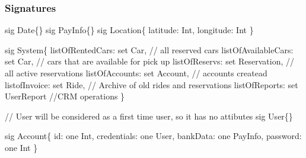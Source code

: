 \documentclass[a4paper]{article}
\begin{document}
\subsubsection{Signatures}

sig Date\{\} \newline
\newline
sig PayInfo\{\} \newline
\newline
sig Location\{ \newline
\hspace*{5 mm}	latitude: Int, \newline
\hspace*{5 mm}	longitude: Int \newline
\} \newline

sig System\{ \newline
\hspace*{5 mm}	listOfRentedCars: set Car, // all reserved cars   \newline
\hspace*{5 mm}	listOfAvailableCars: set Car, // cars that are available for pick up  \newline
\hspace*{5 mm}	listOfReservs: set Reservation, // all active reservations  \newline
\hspace*{5 mm}	listOfAccounts: set Account, // accounts createad  \newline
\hspace*{5 mm}	listofInvoice: set Ride, // Archive of old rides and reservations  \newline
\hspace*{5 mm}	listOfReports: set UserReport //CRM operations  \newline
\} \newline

// User will be considered as a first time user, so it has no attibutes  \newline
sig User\{\} \newline

sig Account\{  \newline
\hspace*{5 mm}	id: one Int, \newline
\hspace*{5 mm}	credentials: one User,  \newline
\hspace*{5 mm}	bankData: one PayInfo, \newline
\hspace*{5 mm}	password: one Int \newline
\} \newline
\end{document}
